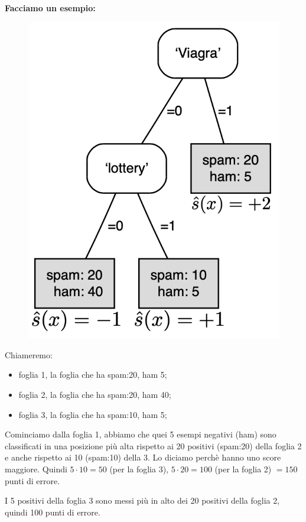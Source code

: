 \textbf{Facciamo un esempio:}
\begin{figure}[!h]
    \centering
    \includegraphics[scale=0.6]{images/rankError.png}
    \label{fig:enter-label}
\end{figure}


Chiameremo:
\begin{itemize}
    \item foglia 1, la foglia che ha spam:20, ham 5;
    \item foglia 2, la foglia che ha spam:20, ham 40;
    \item foglia 3, la foglia che ha spam:10, ham 5;
\end{itemize}
Cominciamo dalla foglia 1, abbiamo che quei 5 esempi negativi (ham) sono classificati in una posizione più alta rispetto ai 20 positivi (spam:20) della foglia 2 e anche rispetto ai 10 (spam:10) della 3. Lo diciamo perchè hanno uno score maggiore. Quindi $5\cdot 10 = 50$ (per la foglia 3), $5\cdot 20 = 100$ (per la foglia 2) $=150$ punti di errore.  

I 5 positivi della foglia 3 sono messi più in alto dei 20 positivi della foglia 2, quindi 100 punti di errore.


